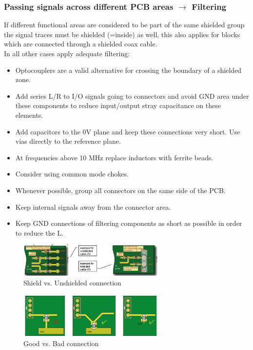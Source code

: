 		\subsubsection{Passing signals across different PCB areas $\rightarrow$ Filtering}
		If different functional areas are considered to be part of the same shielded group the signal traces must be shielded (=inside) as well, this also applies for blocks which are connected through a shielded coax cable. \\
		In all other cases apply adequate filtering:
		\begin{itemize}
			\item Optocouplers are a valid alternative for crossing the boundary of a shielded zone.
			\item Add series L/R to I/O signals going to connectors and avoid GND area under these components to reduce input/output stray capacitance on these elements. 
			\item Add capacitors to the 0V plane and keep these connections very short. Use vias directly to the reference plane. 
			\item At frequencies above 10 MHz replace inductors with ferrite beads. 
			\item Consider using common mode chokes. 
			\item Whenever possible, group all connectors on the same side of the PCB. 
			\item Keep internal signals away from the connector area. 
			\item Keep GND connections of filtering components as short as possible in order to reduce the L. 
		\end{itemize}
		\begin{figure}[h!]
			\centering
			\includegraphics[width=0.65\textwidth]{images/ShieldUnshieldedIO.png}
			\caption{Shield vs. Unshielded connection}
			\label{Fig:ShieldvsUnshielded}
		\end{figure}
		\begin{figure}[h!]
			\centering
			\includegraphics[width=0.65\textwidth]{images/GoodBadConnection.png}
			\caption{Good vs. Bad connection}
			\label{Fig:GoodvsBad}
		\end{figure}
